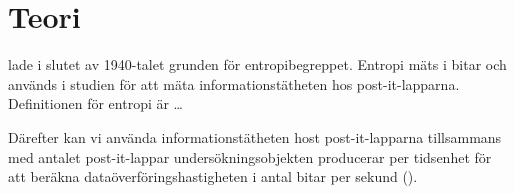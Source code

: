 \section{Teori}
\label{ch:theory}
\citet{Shannon1948amt} lade i slutet av 1940-talet grunden för 
entropibegreppet.
Entropi mäts i bitar och används i studien för att mäta informationstätheten 
hos post-it-lapparna.
Definitionen för entropi är \dots

Därefter kan vi använda informationstätheten host post-it-lapparna tillsammans 
med antalet post-it-lappar undersökningsobjekten producerar per tidsenhet för 
att beräkna dataöverföringshastigheten i antal bitar per sekund 
(\bit\per\second).
